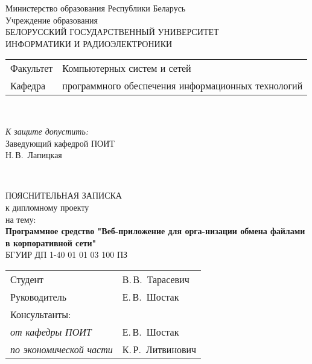 \begin{titlepage}
  \begin{center}
    Министерство образования Республики Беларусь\\[1em]
    Учреждение образования\\
    БЕЛОРУССКИЙ ГОСУДАРСТВЕННЫЙ УНИВЕРСИТЕТ \\
    ИНФОРМАТИКИ И РАДИОЭЛЕКТРОНИКИ\\[1em]

    \begin{minipage}{\textwidth}
      \begin{flushleft}
        \begin{tabular}{ l l }
          Факультет & Компьютерных систем и сетей\\
          Кафедра   & программного обеспечения информационных технологий
        \end{tabular}
      \end{flushleft}
    \end{minipage}\\[1em]

    \begin{flushright}
      \begin{minipage}{0.4\textwidth}
        \textit{К защите допустить:}\\[0.8em]
        Заведующий кафедрой ПОИТ\\[0.45em]
        \underline{\hspace*{2.8cm}} Н.\,В.~Лапицкая
      \end{minipage}\\[2.2em]
    \end{flushright}

    {ПОЯСНИТЕЛЬНАЯ ЗАПИСКА}\\
    {к дипломному проекту}\\
    {на тему:}\\[1em]
    \textbf{\large Программное средство "Веб-приложение для орга-низации обмена файлами в корпоративной сети"}\\[1em]


    {БГУИР ДП 1-40 01 01 03 100 ПЗ}\\[2em]
    
    \begin{tabular}{ p{}p{} }
      Студент & В.\,В.~Тарасевич \\
      Руководитель & Е.\,В.~Шостак \\
      Консультанты: &\\
      \hspace*{3ex}\emph{от кафедры ПОИТ} & Е.\,В.~Шостак \\
      \hspace*{3ex}\emph{по экономической части} & К.\,Р.~Литвинович \\


\end{tabular}
\end{center}
\end{titlepage}
